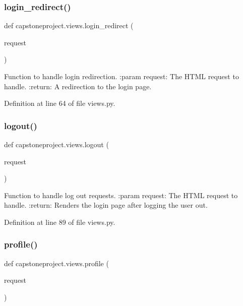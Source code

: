 \subsubsection{\texorpdfstring{login\+\_\+redirect()}{login\_redirect()}}
{\footnotesize\ttfamily def capstoneproject.\+views.\+login\+\_\+redirect (\begin{DoxyParamCaption}\item[{}]{request }\end{DoxyParamCaption})}

\begin{DoxyVerb}Function to handle login redirection.
:param request: The HTML request to handle.
:return: A redirection to the login page.
\end{DoxyVerb}
 

Definition at line 64 of file views.\+py.

\mbox{\label{namespacecapstoneproject_1_1views_a07599532865c8f2870b6cbf91cf00a28}} 
\subsubsection{\texorpdfstring{logout()}{logout()}}
{\footnotesize\ttfamily def capstoneproject.\+views.\+logout (\begin{DoxyParamCaption}\item[{}]{request }\end{DoxyParamCaption})}

\begin{DoxyVerb}Function to handle log out requests.
:param request: The HTML request to handle.
:return: Renders the login page after logging the user out.
\end{DoxyVerb}
 

Definition at line 89 of file views.\+py.

\mbox{\label{namespacecapstoneproject_1_1views_a84e35a622ec043412f06e74fea5faa9e}} 
\subsubsection{\texorpdfstring{profile()}{profile()}}
{\footnotesize\ttfamily def capstoneproject.\+views.\+profile (\begin{DoxyParamCaption}\item[{}]{request }\end{DoxyParamCaption})}

